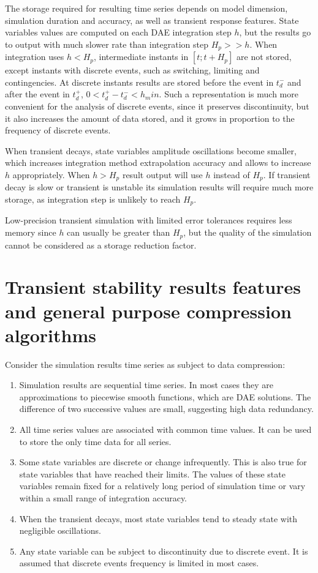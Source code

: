 \documentclass[lettersize,journal]{IEEEtran}
\begin{document}
The storage required for resulting time series depends on model dimension, simulation duration
and accuracy, as well as transient response features. State variables values are computed on each DAE integration
step \(h\), but the results go to output with much slower rate than integration step \(H_p>>h\). 
When integration uses \(h<H_p\), intermediate instants in \([t;t+H_p]\) are not stored, except
instants with discrete events, such as switching, limiting and contingencies. At discrete instants
results are stored before the event in \(t_d^-\) and after the event in \(t_d^+\), \(0<t_d^+-t_d^-<h_min\).
Such a representation is much more convenient for the analysis of discrete events, since it preserves
discontinuity, but it also increases the amount of data stored, and it grows in proportion to the 
frequency of discrete events.

When transient decays, state variables amplitude oscillations become smaller, which increases
integration method extrapolation accuracy and allows to increase \(h\) appropriately.
When \(h>H_p\) result output will use \(h\) instead of \(H_p\). If transient decay is slow or
transient is unstable its simulation results will require much more storage, as integration
step is unlikely to reach \(H_p\). 

Low-precision transient simulation with limited error tolerances requires less memory since \(h\) can usually be
greater than \(H_p\), but the quality of the simulation cannot be considered as a storage reduction factor.

\section{Transient stability results features and general purpose compression algorithms}
Consider the simulation results time series as subject to data compression:

\begin{enumerate}
	\item{Simulation results are sequential time series. In most cases they are approximations
	to piecewise smooth functions, which are DAE solutions. The difference of two successive
	values are small, suggesting high data redundancy.}
	\item{All time series values are associated with common time values. It can be used to store the only time data for all series.}
	\item{Some state variables are discrete or change infrequently. This is also true for state variables that have reached their limits. The values of these state variables remain fixed for a relatively long period of simulation time or vary within a small range of integration accuracy.}
	\item{When the transient decays, most state variables tend to steady state with negligible oscillations.}
	\item{Any state variable can be subject to discontinuity due to discrete event. It is assumed that discrete events frequency is limited in most cases. }
\end{enumerate}
\end{document}
